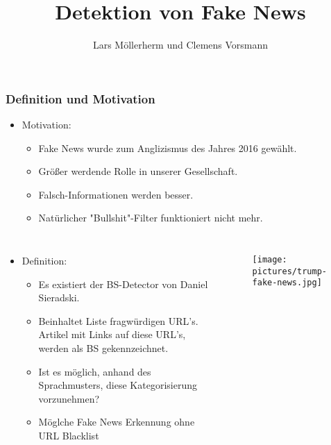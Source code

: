 \documentclass[aspectratio=1610, professionalfonts, 9pt]{beamer}
\title{Detektion von Fake News}
\author{Lars Möllerherm und Clemens Vorsmann}
\institute{Fakultät Physik}
\begin{document}
  \begin{frame}
    \titlepage
  \end{frame}

  \begin{frame}
    \frametitle{Definition und Motivation}
    \begin{itemize}
      \item Motivation:
      \begin{itemize}
        \item Fake News wurde zum Anglizismus des Jahres 2016 gewählt\cite{angli}.
        \item Größer werdende Rolle in unserer Gesellschaft.
        \item Falsch-Informationen werden besser.
        \item Natürlicher "Bullshit"-Filter funktioniert nicht mehr.
      \end{itemize}
    \end{itemize}
    \begin{columns}
      \begin{itemize}
        \item Definition:
        \begin{itemize}
        \item Es existiert der BS-Detector von Daniel Sieradski\cite{BS}.
        \item Beinhaltet Liste fragwürdigen URL's. Artikel mit Links auf diese URL's, 
            werden als BS gekennzeichnet.
        \item Ist es möglich, anhand des Sprachmusters, diese Kategorisierung vorzunehmen?
        \item Möglche Fake News Erkennung ohne URL Blacklist
        \end{itemize}
      \end{itemize}
      \begin{figure}
          \texttt{[image: pictures/trump-fake-news.jpg]}
          \caption{\cite{trump}}
          \label{}
        \end{figure}
      \end{columns}
  \end{frame}
\end{document}
